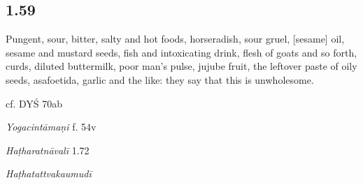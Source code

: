 \begin{ekdosis}
\begin{philcomm}[hp01_058]
\end{philcomm}

\subsection*{1.59}
\begin{translation}[hp01_059]
 Pungent, sour, bitter, salty and hot foods, horseradish, sour gruel, [sesame] oil, sesame and mustard seeds, fish and intoxicating drink, flesh of goats and so forth, curds, diluted buttermilk, poor man's pulse, jujube fruit, the leftover paste of oily seeds, asafoetida, garlic and the like: they say that this is unwholesome.
\end{translation}

\begin{sources}[hp01_059]
cf. DYŚ 70ab
\end{sources}

\begin{testimonia}[hp01_059]
\emph{Yogacintāmaṇi} f. 54v

\begin{versinnote}
\end{versinnote}

\emph{Haṭharatnāvalī} 1.72

\begin{versinnote}
\end{versinnote}

\emph{Haṭhatattvakaumudī}

\begin{versinnote}
\end{versinnote}


\end{testimonia}
\end{ekdosis}
